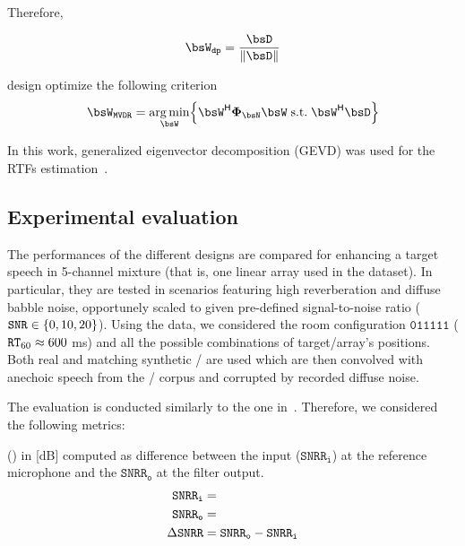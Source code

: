 Therefore,

\begin{equation}
    \bsW_{\mathtt{dp}} = \frac{\bsD}{\kvvbar{\bsD}}
\end{equation}

  design optimize the following criterion
\begin{equation}
    \bsW_{\MVDR} = \kargmin_{\bsW} \kbrace{ \khermitian{\bsW} \xpsd_{\NSES} \bsW\;\text{s.t.}\;\khermitian{\bsW} \bsD}
\end{equation}

In this work, generalized eigenvector decomposition (GEVD) was used for the RTFs estimation~.



\subsection{Experimental evaluation}
The performances of the different designs are compared for enhancing a target speech in 5-channel mixture (that is, one linear array used in the \dEchorate{} dataset).
In particular, they are tested in scenarios featuring high reverberation and diffuse babble noise, opportunely scaled to given pre-defined signal-to-noise ratio ($\SNR \in \kbrace{0, 10, 20}$).
Using the \dEchorate{} data, we considered the room configuration $\mathtt{011111}$ ($\mathtt{RT}_{60} \approx 600 $ ms) and all the possible combinations of target/array's positions.
Both real and matching synthetic \RIRs/ are used which are then convolved with anechoic speech from the \WSJ/ corpus and corrupted by recorded diffuse noise.

\mynewline
The evaluation is conducted similarly to the one in~.
Therefore, we considered the following metrics:


 (\DSNRR) in [dB] computed as difference between the input ($\mathtt{SNRR}_\mathtt{i}$) at the reference microphone and the $\mathtt{SNRR}_\mathtt{o}$ at the filter output.
    \begin{equation}
        \begin{aligned}
            \mathtt{SNRR}_\mathtt{i} &=\\
            \mathtt{SNRR}_\mathtt{o}&=\\
            \Delta\mathtt{SNRR} &= \mathtt{SNRR}_\mathtt{o} - \mathtt{SNRR}_\mathtt{i}
        \end{aligned}
    \end{equation}

